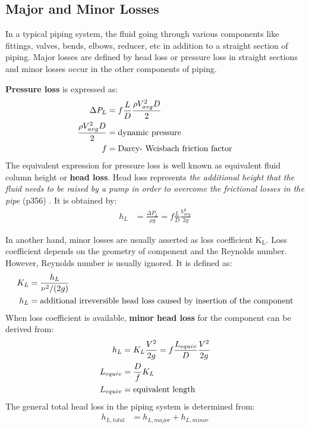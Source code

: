 \subsection{Major and Minor Losses}
In a typical piping system, the fluid going through various components like fittings, valves, bends, elbows, reducer, etc in addition to a straight section of piping. Major losses are defined by head loss or pressure loss in straight sections and minor losses occur in the other components of piping. 

\textbf{Pressure loss} is expressed as:
\begin{align}
\Delta P_L & = f \frac{L}{D} \frac{\rho V_{avg}^2 D }{2}   \\
\frac{\rho V_{avg}^2 D }{2}   & = \textnormal{dynamic pressure} \\
f & = \textnormal{Darcy- Weisbach friction factor} 
\end{align}
The equivalent expression for pressure loss is well known as equivalent fluid column height or \textbf{head loss}. Head loss represents \textit{the additional height that the fluid needs to be raised by a pump in order to overcome the frictional losses in the pipe} (p356) \cite{cengel:book}. It is obtained by:
\begin{align}
 h_L & =  \frac{\Delta P_L}{\rho g} = f \frac{L}{D} \frac{V_{avg}^2 }{2g}
\end{align}

In another hand, minor losses are usually asserted as loss coefficient K$_{\text{L}}$.  Loss coefficient depends on the geometry of component and the Reynolds number. However, Reynolds number is usually ignored. It is defined as:
\begin{align}
K_L & =  \frac{h_L}{\nu^2 / (2g)}  \\
h_L  & = \textnormal{additional irreversible head loss caused by insertion of the component}
\end{align}
When loss coefficient is available, \textbf{minor head loss} for the component can be derived from:
\begin{align}
 h_L & =  K_L \frac{V^2}{2g} = f \frac{L_{equiv}}{D} \frac{V^2 }{2g} \\
 L_{equiv} &= \frac{D}{f} K_L \\
 L_{equiv} &= \textnormal{equivalent length}
\end{align}
The general total head loss in the piping system is determined from:
\begin{align}
 h_{L, total} & = h_{L, major} + h_{L, minor}
\end{align}

